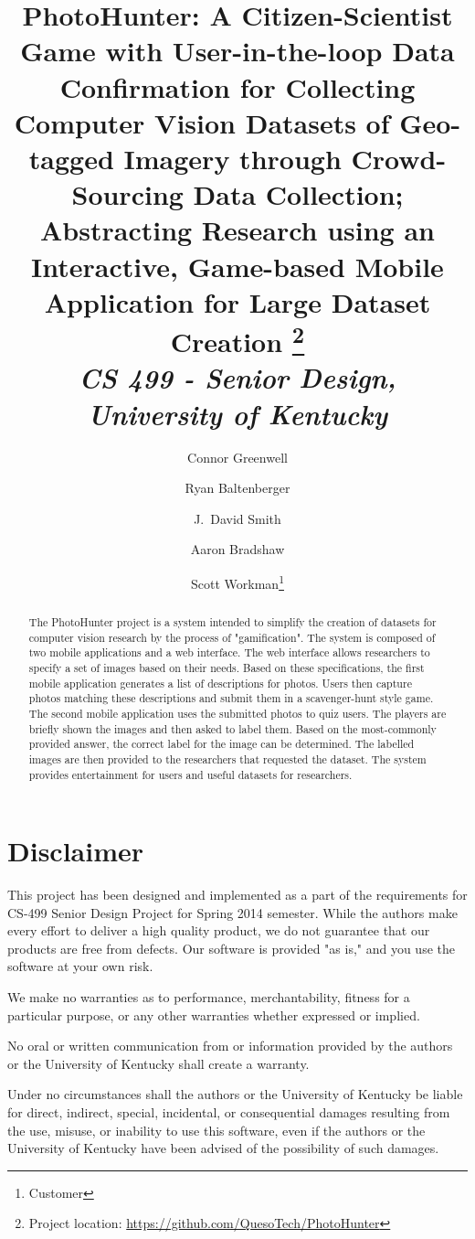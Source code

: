 \documentclass{article}
\title{PhotoHunter: A Citizen-Scientist Game with User-in-the-loop
  Data Confirmation for Collecting Computer Vision Datasets of
  Geo-tagged Imagery through Crowd-Sourcing Data Collection; Abstracting
  Research using an Interactive, Game-based Mobile Application for Large
  Dataset Creation
  \footnote{Project location:
    \url{https://github.com/QuesoTech/PhotoHunter}
  } \\
  \textit{CS 499 - Senior Design, University of Kentucky}
}
\author{Connor Greenwell \and Ryan Baltenberger
  \and J.\ David Smith \and Aaron Bradshaw
\and Scott Workman\footnote{Customer}}
\begin{document}
\maketitle

\begin{abstract}
  The PhotoHunter project is a system intended to simplify the creation of
  datasets for computer vision research by the process of "gamification". The
  system is composed of two mobile applications and a web interface. The web
  interface allows researchers to specify a set of images based on their needs.
  Based on these specifications, the first mobile application generates a list of
  descriptions for photos. Users then capture photos matching these descriptions
  and submit them in a scavenger-hunt style game. The second mobile application
  uses the submitted photos to quiz users. The players are briefly shown the
  images and then asked to label them. Based on the most-commonly provided
  answer, the correct label for the image can be determined. The labelled images
  are then provided to the researchers that requested the dataset. The system
  provides entertainment for users and useful datasets for researchers.
\end{abstract}




\section{Disclaimer}
This project has been designed and implemented as a part of the requirements
for CS-499 Senior Design Project for Spring 2014 semester.  While the authors
make every effort to deliver a high quality product, we do not guarantee that
our products are free from defects.  Our software is provided "as is," and you
use the software at your own risk.

We make no warranties as to performance, merchantability, fitness for a
particular purpose, or any other warranties whether expressed or implied.

No oral or written communication from or information provided by the authors or
the University of Kentucky shall create a warranty.

Under no circumstances shall the authors or the University of Kentucky be
liable for direct, indirect, special, incidental, or consequential damages
resulting from the use, misuse, or inability to use this software, even if the
authors or the University of Kentucky have been advised of the possibility of
such damages.
\end{document}
